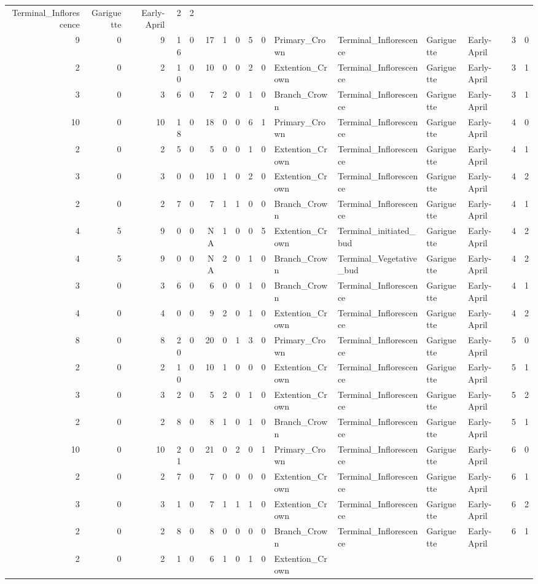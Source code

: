 \documentclass[]{article}
\begin{document}
\begin{longtable}[]{@{}rrrrrrrrrrllllrl@{}}
Terminal\_Inflorescence & Gariguette & Early-April & 2 &
2\tabularnewline
9 & 0 & 9 & 16 & 0 & 17 & 1 & 0 & 5 & 0 & Primary\_Crown &
Terminal\_Inflorescence & Gariguette & Early-April & 3 &
0\tabularnewline
2 & 0 & 2 & 10 & 0 & 10 & 0 & 0 & 2 & 0 & Extention\_Crown &
Terminal\_Inflorescence & Gariguette & Early-April & 3 &
1\tabularnewline
3 & 0 & 3 & 6 & 0 & 7 & 2 & 0 & 1 & 0 & Branch\_Crown &
Terminal\_Inflorescence & Gariguette & Early-April & 3 &
1\tabularnewline
10 & 0 & 10 & 18 & 0 & 18 & 0 & 0 & 6 & 1 & Primary\_Crown &
Terminal\_Inflorescence & Gariguette & Early-April & 4 &
0\tabularnewline
2 & 0 & 2 & 5 & 0 & 5 & 0 & 0 & 1 & 0 & Extention\_Crown &
Terminal\_Inflorescence & Gariguette & Early-April & 4 &
1\tabularnewline
3 & 0 & 3 & 0 & 0 & 10 & 1 & 0 & 2 & 0 & Extention\_Crown &
Terminal\_Inflorescence & Gariguette & Early-April & 4 &
2\tabularnewline
2 & 0 & 2 & 7 & 0 & 7 & 1 & 1 & 0 & 0 & Branch\_Crown &
Terminal\_Inflorescence & Gariguette & Early-April & 4 &
1\tabularnewline
4 & 5 & 9 & 0 & 0 & NA & 1 & 0 & 0 & 5 & Extention\_Crown &
Terminal\_initiated\_bud & Gariguette & Early-April & 4 &
2\tabularnewline
4 & 5 & 9 & 0 & 0 & NA & 2 & 0 & 1 & 0 & Branch\_Crown &
Terminal\_Vegetative\_bud & Gariguette & Early-April & 4 &
2\tabularnewline
3 & 0 & 3 & 6 & 0 & 6 & 0 & 0 & 1 & 0 & Branch\_Crown &
Terminal\_Inflorescence & Gariguette & Early-April & 4 &
1\tabularnewline
4 & 0 & 4 & 0 & 0 & 9 & 2 & 0 & 1 & 0 & Extention\_Crown &
Terminal\_Inflorescence & Gariguette & Early-April & 4 &
2\tabularnewline
8 & 0 & 8 & 20 & 0 & 20 & 0 & 1 & 3 & 0 & Primary\_Crown &
Terminal\_Inflorescence & Gariguette & Early-April & 5 &
0\tabularnewline
2 & 0 & 2 & 10 & 0 & 10 & 1 & 0 & 0 & 0 & Extention\_Crown &
Terminal\_Inflorescence & Gariguette & Early-April & 5 &
1\tabularnewline
3 & 0 & 3 & 2 & 0 & 5 & 2 & 0 & 1 & 0 & Extention\_Crown &
Terminal\_Inflorescence & Gariguette & Early-April & 5 &
2\tabularnewline
2 & 0 & 2 & 8 & 0 & 8 & 1 & 0 & 1 & 0 & Branch\_Crown &
Terminal\_Inflorescence & Gariguette & Early-April & 5 &
1\tabularnewline
10 & 0 & 10 & 21 & 0 & 21 & 0 & 2 & 0 & 1 & Primary\_Crown &
Terminal\_Inflorescence & Gariguette & Early-April & 6 &
0\tabularnewline
2 & 0 & 2 & 7 & 0 & 7 & 0 & 0 & 0 & 0 & Extention\_Crown &
Terminal\_Inflorescence & Gariguette & Early-April & 6 &
1\tabularnewline
3 & 0 & 3 & 1 & 0 & 7 & 1 & 1 & 1 & 0 & Extention\_Crown &
Terminal\_Inflorescence & Gariguette & Early-April & 6 &
2\tabularnewline
2 & 0 & 2 & 8 & 0 & 8 & 0 & 0 & 0 & 0 & Branch\_Crown &
Terminal\_Inflorescence & Gariguette & Early-April & 6 &
1\tabularnewline
2 & 0 & 2 & 1 & 0 & 6 & 1 & 0 & 1 & 0 & Extention\_Crown &

\end{longtable}
\end{document}
